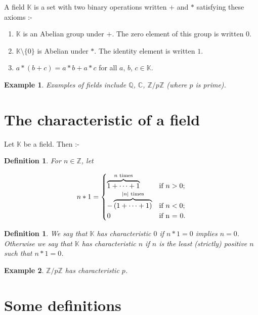 \documentclass{notes}
\theoremstyle{plain}
\newtheorem{definition}[theorem]{Definition}
\newtheorem*{example}{Example}
\begin{document}
A field $\mathbb{K}$ is a set with two binary operations written $+$
and $*$ satisfying these axioms :-

\begin{enumerate}
\item $\mathbb{K}$ is an Abelian group under $+$.  The zero element of
  this group is written $0$.
\item $\mathbb{K}\setminus \{0\}$ is Abelian under $*$.  The identity
  element is written $1$.
\item $a*(b+c) = a*b+a*c$ for all $a$, $b$, $c \in \mathbb{K}$.
\end{enumerate}

\begin{example}
  Examples of fields include $\mathbb{Q}$, $\mathbb{C}$, $\mathbb{Z} /
  p\mathbb{Z}$ (where $p$ is prime).
\end{example}

\section{The characteristic of a field}

Let $\mathbb{K}$ be a field.  Then :-

\begin{definition}
  For $n \in \mathbb{Z}$, let

\[
n*1 =
\begin{cases}
  \overbrace{1 + \dots + 1}^{\text{$n$ times}} & \text{if $n > 0$;}  \\
  -\overbrace{(1+ \dots + 1)}^{\text{$\left|n\right|$ times}} & \text{if $n <0$;} \\
  0 & \text{if n = 0.}
\end{cases}
\]

\end{definition}

\begin{definition}
  We say that $\mathbb{K}$ has characteristic $0$ if $n*1 = 0$ implies
  $n = 0$.  Otherwise we say that $\mathbb{K}$ has characteristic $n$
  if $n$ is the least (strictly) positive $n$ such that $n*1 = 0$.
\end{definition}

\begin{example}
  $\mathbb{Z} / p\mathbb{Z}$ has characteristic $p$.
\end{example}

\section{Some definitions}
\end{document}
